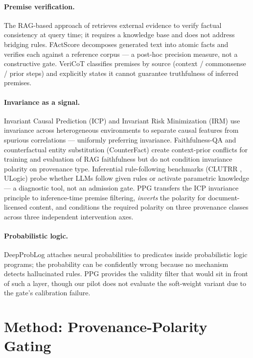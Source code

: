 \documentclass[11pt,letterpaper]{article}
\begin{document}
\paragraph{Premise verification.}
The RAG-based approach of \citet{Qin2025} retrieves external evidence to verify factual consistency at query time; it requires a knowledge base and does not address bridging rules. FActScore \citep{Min2023} decomposes generated text into atomic facts and verifies each against a reference corpus --- a post-hoc precision measure, not a constructive gate. VeriCoT classifies premises by source (context / commonsense / prior steps) and explicitly states it cannot guarantee truthfulness of inferred premises.

\paragraph{Invariance as a signal.}
Invariant Causal Prediction (ICP) \citep{Peters2016} and Invariant Risk Minimization (IRM) \citep{Arjovsky2019} use invariance across heterogeneous environments to separate causal features from spurious correlations --- uniformly preferring invariance. Faithfulness-QA and counterfactual entity substitution (CounterFact) create context-prior conflicts for training and evaluation of RAG faithfulness but do not condition invariance polarity on provenance type. Inferential rule-following benchmarks \citep{Sun2024} (CLUTRR \citep{Sinha2019}, ULogic) probe whether LLMs follow given rules or activate parametric knowledge --- a diagnostic tool, not an admission gate. PPG transfers the ICP invariance principle to inference-time premise filtering, \textit{inverts} the polarity for document-licensed content, and conditions the required polarity on three provenance classes across three independent intervention axes.

\paragraph{Probabilistic logic.}
DeepProbLog \citep{Manhaeve2018} attaches neural probabilities to predicates inside probabilistic logic programs; the probability can be confidently wrong because no mechanism detects hallucinated rules. PPG provides the validity filter that would sit in front of such a layer, though our pilot does not evaluate the soft-weight variant due to the gate's calibration failure.

\section{Method: Provenance-Polarity Gating}
\label{sec:method}
\end{document}
